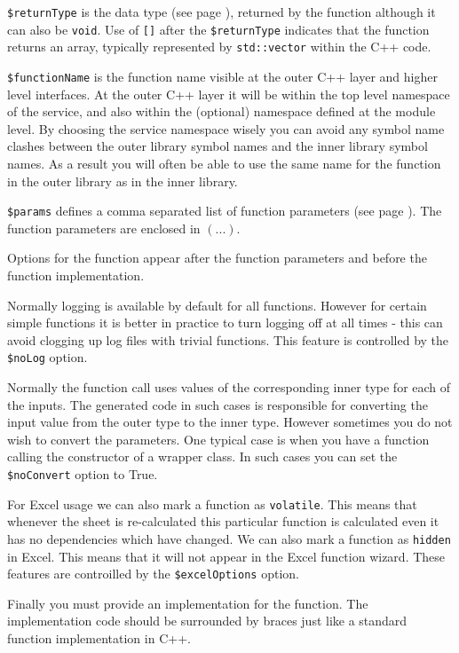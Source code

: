 \texttt{\$returnType} is the data type (see page \pageref{dataType}), returned by the function although it can also be \texttt{void}.
Use of \texttt{[]} after the \texttt{\$returnType} indicates that the function returns an array, typically represented by \texttt{std::vector} within the C++ code.

\texttt{\$functionName} is the function name visible at the outer C++ layer and higher level interfaces. At the outer C++ layer it will be within the top level namespace of the service, and also within the (optional) namespace defined at the module level. By choosing the service namespace wisely you can avoid any symbol name clashes between the outer library symbol names and the inner library symbol names. As a result you will often be able to use the same name for the function in the outer library as in the inner library.

\texttt{\$params} defines a comma separated list of function parameters (see page \pageref{functionParam}). The function parameters are enclosed in $(...)$.

Options for the function appear after the function parameters and before the function implementation.

Normally logging is available by default for all functions.
However for certain simple functions it is better in practice to turn logging off at all times - this can avoid clogging up log files with trivial functions.
This feature is controlled by the \texttt{\$noLog} option.

Normally the function call uses values of the corresponding inner type for each of the inputs.
The generated code in such cases is responsible for converting the input value from the outer type to the inner type.
However sometimes you do not wish to convert the parameters.
One typical case is when you have a function calling the constructor of a wrapper class.
In such cases you can set the \texttt{\$noConvert} option to True.

For Excel usage we can also mark a function as \texttt{volatile}.
This means that whenever the sheet is re-calculated this particular function is calculated even it has no dependencies which have changed.
We can also mark a function as \texttt{hidden} in Excel.
This means that it will not appear in the Excel function wizard.
These features are controilled by the \texttt{\$excelOptions} option.

Finally you must provide an implementation for the function. The implementation code should be surrounded by braces just like a standard function implementation in C++.

